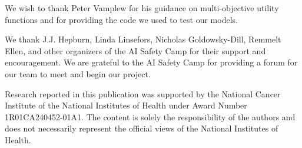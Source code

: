 We wish to thank Peter Vamplew for his guidance on multi-objective utility functions and for providing the code we used to test our models. 

We thank J.J. Hepburn, Linda Linsefors, Nicholas Goldowsky-Dill, Remmelt Ellen, and other organizers of the AI Safety Camp for their support and encouragement. We are grateful to the AI Safety Camp for providing a forum for our team to meet and begin our project.

Research reported in this publication was supported by the National Cancer Institute of the National Institutes of Health under Award Number 1R01CA240452-01A1. The content is solely the responsibility of the authors and does not necessarily represent the official views of the National Institutes of Health.